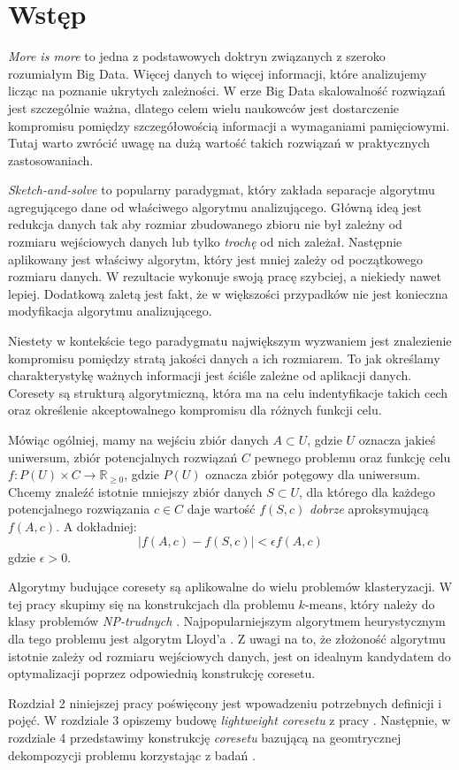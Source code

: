 \chapter{Wstęp}
\textit{More is more} to jedna z podstawowych doktryn związanych z szeroko rozumiałym Big Data.
Więcej danych to więcej informacji, które analizujemy licząc na poznanie ukrytych zależności.
W erze Big Data skalowalność rozwiązań jest szczególnie ważna, dlatego celem wielu naukowców jest dostarczenie kompromisu pomiędzy szczegółowością informacji a wymaganiami pamięciowymi.
Tutaj warto zwrócić uwagę na dużą wartość takich rozwiązań w praktycznych zastosowaniach.

\textit{Sketch-and-solve} to popularny paradygmat, który zakłada separacje algorytmu agregującego dane od właściwego algorytmu analizującego.
Główną ideą jest redukcja danych tak aby rozmiar zbudowanego zbioru nie był zależny od rozmiaru wejściowych danych lub tylko \textit{trochę} od nich zależał.
Następnie aplikowany jest właściwy algorytm, który jest mniej zależy od początkowego rozmiaru danych.
W rezultacie wykonuje swoją pracę szybciej, a niekiedy nawet lepiej.
Dodatkową zaletą jest fakt, że w większości przypadków nie jest konieczna modyfikacja algorytmu analizującego.

Niestety w kontekście tego paradygmatu największym wyzwaniem jest znalezienie kompromisu pomiędzy stratą jakości danych a ich rozmiarem.
To jak określamy charakterystykę ważnych informacji jest ściśle zależne od aplikacji danych.
Coresety są strukturą algorytmiczną, która ma na celu indentyfikacje takich cech oraz określenie akceptowalnego kompromisu dla różnych funkcji celu.

Mówiąc ogólniej, mamy na wejściu zbiór danych $A \subset U$, gdzie $U$ oznacza jakieś uniwersum, zbiór potencjalnych rozwiązań $C$ pewnego problemu oraz funkcję celu $f:P(U) \times C \rightarrow \mathbb{R}_{\geq0}$, gdzie $P(U)$ oznacza zbiór potęgowy dla uniwersum.
Chcemy znaleźć istotnie mniejszy zbiór danych $S \subset U$, dla którego dla każdego potencjalnego rozwiązania $c \in C$ daje wartość $f(S, c)$ \textit{dobrze} aproksymującą $f(A,c)$.
A dokładniej:
\begin{equation}
    |f(A,c) - f(S,c)| < \epsilon f(A,c)
\end{equation}
\noindent
gdzie $\epsilon > 0$.

Algorytmy budujące coresety są aplikowalne do wielu problemów klasteryzacji.
W tej pracy skupimy się na konstrukcjach dla problemu $k$-means, który należy do klasy problemów \textit{NP-trudnych} \cite{article}.
Najpopularniejszym algorytmem heurystycznym dla tego problemu jest algorytm Lloyd'a \cite{1056489}.
Z uwagi na to, że złożoność algorytmu istotnie zależy od rozmiaru wejściowych danych, jest on idealnym kandydatem do optymalizacji poprzez odpowiednią konstrukcję coresetu.

Rozdział 2 niniejszej pracy poświęcony jest wpowadzeniu potrzebnych definicji i pojęć.
W rozdziale 3 opiszemy budowę \textit{lightweight coresetu} z pracy \cite{bachem2017scalable}.
Następnie, w rozdziale 4 przedstawimy konstrukcję \textit{coresetu} bazującą na geomtrycznej dekompozycji problemu korzystając z badań \cite{DBLP:journals/ki/MunteanuS18}.